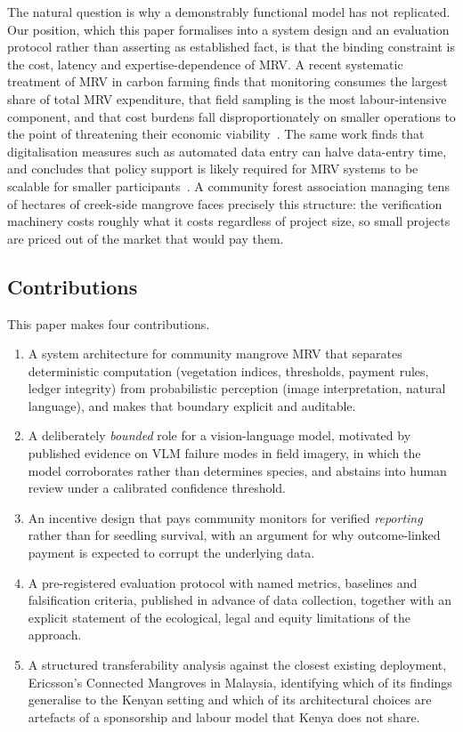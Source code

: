 \documentclass[10pt,twocolumn,a4paper]{article}
\begin{document}
The natural question is why a demonstrably functional model has not replicated.
Our position, which this paper formalises into a system design and an
evaluation protocol rather than asserting as established fact, is that the
binding constraint is the cost, latency and expertise-dependence of MRV. A
recent systematic treatment of MRV in carbon farming finds that monitoring
consumes the largest share of total MRV expenditure, that field sampling is the
most labour-intensive component, and that cost burdens fall disproportionately
on smaller operations to the point of threatening their economic
viability~\cite{vanderheyden2026}. The same work finds that digitalisation
measures such as automated data entry can halve data-entry time, and concludes
that policy support is likely required for MRV systems to be scalable for
smaller participants~\cite{vanderheyden2026}. A community forest association
managing tens of hectares of creek-side mangrove faces precisely this structure:
the verification machinery costs roughly what it costs regardless of project
size, so small projects are priced out of the market that would pay them.

\subsection{Contributions}

This paper makes four contributions.

\begin{enumerate}[label=(\arabic*)]
\item A system architecture for community mangrove MRV that separates
deterministic computation (vegetation indices, thresholds, payment rules,
ledger integrity) from probabilistic perception (image interpretation, natural
language), and makes that boundary explicit and auditable.
\item A deliberately \emph{bounded} role for a vision-language model, motivated
by published evidence on VLM failure modes in field imagery, in which the model
corroborates rather than determines species, and abstains into human review
under a calibrated confidence threshold.
\item An incentive design that pays community monitors for verified
\emph{reporting} rather than for seedling survival, with an argument for why
outcome-linked payment is expected to corrupt the underlying data.
\item A pre-registered evaluation protocol with named metrics, baselines and
falsification criteria, published in advance of data collection, together with
an explicit statement of the ecological, legal and equity limitations of the
approach.
\item A structured transferability analysis against the closest existing
deployment, Ericsson's Connected Mangroves in Malaysia, identifying which of its
findings generalise to the Kenyan setting and which of its architectural choices
are artefacts of a sponsorship and labour model that Kenya does not share.
\end{enumerate}
\end{document}
